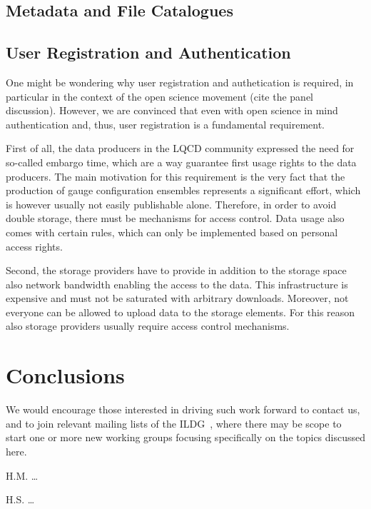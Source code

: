 \documentclass[a4paper,11pt]{article} \usepackage{pos} \usepackage{subcaption}
\begin{document}
\subsection{Metadata and File Catalogues}

\subsection{User Registration and Authentication}

One might be wondering why user registration and authetication is
required, in particular in the context of the open science movement
(cite the panel discussion). However, we are convinced that even with
open science in mind authentication and, thus, user registration is a
fundamental requirement.

First of all, the data producers in the LQCD community expressed the
need for so-called embargo time, which are a way guarantee first usage
rights to the data producers. The main motivation for this requirement
is the very fact that the production of gauge configuration ensembles
represents a significant effort, which is however usually not
easily publishable alone. Therefore, in order to avoid double storage,
there must be mechanisms for access control. Data usage also comes
with certain rules, which can only be implemented based on personal
access rights.

Second, the storage providers have to provide in addition to the
storage space also network bandwidth enabling the access to the
data. This infrastructure is expensive and must not be saturated with
arbitrary downloads. Moreover, not everyone can be allowed to upload
data to the storage elements. For this reason also storage providers
usually require access control mechanisms.

\section{Conclusions}


We would encourage those interested in driving such work forward
to contact us,
and to join relevant mailing lists of the ILDG~\cite{ildg-organization},
where there may be scope to start one or more new working groups
focusing specifically on the topics discussed here.


\acknowledgments

H.M. \dots

H.S. \dots
\end{document}
